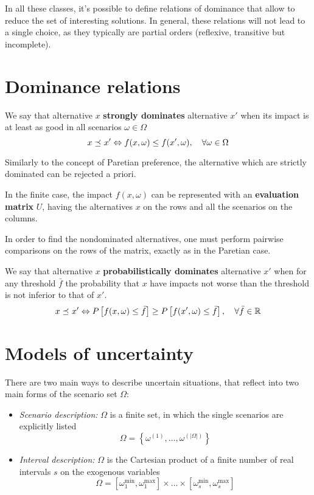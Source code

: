 In all these classes, it's possible to define relations of dominance that allow to reduce the set of interesting solutions. In general, these relations will not lead to a single choice, as they typically are partial orders (reflexive, transitive but incomplete).

\section{Dominance relations}
\label{sec:domrel}

\begin{definition}
	We say that alternative $x$ \textbf{strongly dominates} alternative $x'$ when its impact is at least as good in all scenarios $\omega \in \Omega$
	$$ x \preceq_{} x' \Leftrightarrow f (x, \omega) \leq f(x', \omega), \quad \forall \omega \in \Omega $$
\end{definition}

Similarly to the concept of Paretian preference, the alternative which are strictly dominated can be rejected a priori. \\

\begin{definition}
	In the finite case, the impact $f (x, \omega)$ can be represented with an \textbf{evaluation matrix} $U$, having the alternatives $x$ on the rows and all the scenarios on the columns.
\end{definition}

In order to find the nondominated alternatives, one must perform pairwise comparisons on the rows of the matrix, exactly as in the Paretian case. \\

\begin{definition}
	We say that alternative $x$ \textbf{probabilistically dominates} alternative $x'$ when for any threshold $\bar f$ the probability that $x$ have impacts not worse than the threshold is not inferior to that of $x'$.
	$$ x \preceq_{} x' \Leftrightarrow P \left[f(x, \omega) \leq \bar f\right] \geq P \left[f (x', \omega) \leq \bar f\right], \quad \forall \bar f \in \operatorname{\mathbb{R}} $$
\end{definition}

\section{Models of uncertainty}
\label{sec:modelsuncert}

There are two main ways to describe uncertain situations, that reflect into two main forms of the scenario set $\Omega$: 
\begin{itemize}
	\item \textit{Scenario description:} $\Omega$ is a finite set, in which the single scenarios are explicitly listed
	$$ \Omega = \left\{\omega^{(1)}, \dots, \omega^{(|\Omega|)}\right\} $$
	
	\item \textit{Interval description:} $\Omega$ is the Cartesian product of a finite number of real intervals $s$ on the exogenous variables
	$$ \Omega = \left[\omega_1^{\min}, \omega_1^{\max}\right] \times \dots \times \left[\omega_s^{\min}, \omega_s^{\max}\right]$$
\end{itemize}

